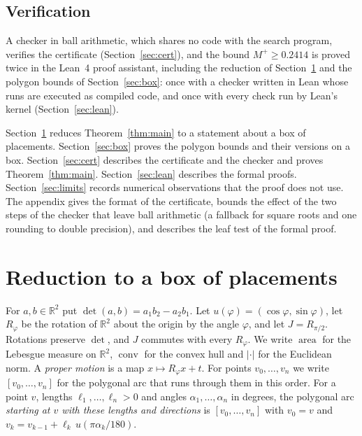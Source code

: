 \documentclass[11pt]{amsart}
\theoremstyle{definition}
\theoremstyle{remark}
\numberwithin{equation}{section}
\newcommand{\R}{\mathbb{R}}
\newcommand{\area}{\operatorname{area}}
\newcommand{\conv}{\operatorname{conv}}
\newcommand{\Mp}{M^{+}}
\newcommand{\TAU}{0.2414}
\begin{document}
\subsection*{Verification}
A checker in ball arithmetic, which shares no code with the search program, verifies the certificate \cite{TomData} (Section~\ref{sec:cert}), and the bound $\Mp\ge\TAU$ is proved twice in the Lean~4 proof assistant, including the reduction of Section~\ref{sec:reduction} and the polygon bounds of Section~\ref{sec:box}: once with a checker written in Lean whose runs are executed as compiled code, and once with every check run by Lean's kernel (Section~\ref{sec:lean}).

Section~\ref{sec:reduction} reduces Theorem~\ref{thm:main} to a statement about a box of placements. Section~\ref{sec:box} proves the polygon bounds and their versions on a box. Section~\ref{sec:cert} describes the certificate and the checker and proves Theorem~\ref{thm:main}. Section~\ref{sec:lean} describes the formal proofs. Section~\ref{sec:limits} records numerical observations that the proof does not use. The appendix gives the format of the certificate, bounds the effect of the two steps of the checker that leave ball arithmetic (a fallback for square roots and one rounding to double precision), and describes the leaf test of the formal proof.

\section{Reduction to a box of placements}\label{sec:reduction}

For $a,b\in\R^2$ put $\det(a,b)=a_1b_2-a_2b_1$. Let $u(\varphi)=(\cos\varphi,\sin\varphi)$, let $R_\varphi$ be the rotation of $\R^2$ about the origin by the angle $\varphi$, and let $J=R_{\pi/2}$. Rotations preserve $\det$, and $J$ commutes with every $R_\varphi$. We write $\area$ for the Lebesgue measure on $\R^2$, $\conv$ for the convex hull and $|\cdot|$ for the Euclidean norm. A \emph{proper motion} is a map $x\mapsto R_\varphi x+t$. For points $v_0,\dots,v_n$ we write $[v_0,\dots,v_n]$ for the polygonal arc that runs through them in this order. For a point $v$, lengths $\ell_1,\dots,\ell_n>0$ and angles $\alpha_1,\dots,\alpha_n$ in degrees, the polygonal arc \emph{starting at $v$ with these lengths and directions} is $[v_0,\dots,v_n]$ with $v_0=v$ and $v_k=v_{k-1}+\ell_k\,u(\pi\alpha_k/180)$.
\end{document}
